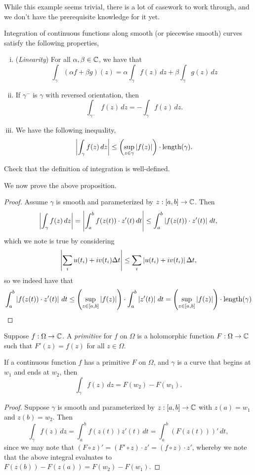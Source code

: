\noindent While this example seems trivial, there is a lot of casework to work through, and we don't have the prerequisite knowledge for it yet.
\begin{proposition}
    Integration of continuous functions along smooth (or piecewise smooth) curves satisfy the following properties,
    \begin{enumerate}[(i)]
        \item (\textit{Linearity}) For all $\alpha, \beta \in \mathbb C$, we have that
        \[ \int_\gamma  (\alpha f + \beta g)(z) = \alpha \int_\gamma f(z) \, dz + \beta \int_\gamma g(z) \, dz\]
        \item If $\gamma^-$ is $\gamma$ with reversed orientation, then
        \[ \int_{\gamma^-} f(z) \, dz = -\int_\gamma f(z) \, dz. \]
        \item We have the following inequality,
        \[ \left\lvert \int_\gamma f(z) \, dz \right\rvert \leq \left(\sup_{z \in \gamma} \left\lvert f(z) \right\rvert\right) \cdot \operatorname{length}(\gamma). \]
    \end{enumerate}
\end{proposition}
\begin{exercise}
    Check that the definition of integration is well-defined.
\end{exercise}
\noindent We now prove the above proposition.
\begin{proof}
    Assume $\gamma$ is smooth and parameterized by $z : [a, b] \to \mathbb C$. Then
    \[ \left\lvert \int_\gamma f(z) \, dz \right\rvert = \left\lvert \int_a^b f(z(t)) \cdot z'(t) \, dt \right\rvert \leq \int_a^b \left\lvert f(z(t)) \cdot z'(t) \right\rvert \, dt, \]
    which we note is true by considering
    \[ \left\lvert \sum_i u(t_i) + i v(t_i) \Delta t \right\rvert \leq \sum_i \left\lvert u(t_i) + iv(t_i) \right\rvert \Delta t, \]
    so we indeed have that
    \[ \int_a^b \left\lvert f(z(t)) \cdot z'(t) \right\rvert \, dt \leq \left(\sup_{z \in [a, b]} \left\lvert f(z) \right\rvert\right) \cdot \int_a^b \left\lvert z'(t) \right\rvert \, dt = \left(\sup_{z \in [a, b]} \left\lvert f(z) \right\rvert\right) \cdot \operatorname{length}(\gamma) \qedhere \]
\end{proof}
\noindent Suppose $f : \Omega \to \mathbb C$. A \textit{primitive} for $f$ on $\Omega$ is a holomorphic function $F : \Omega \to \mathbb C$ such that $F'(z) = f(z)$ for all $z \in \Omega$. 
\begin{theorem}
    If a continuous function $f$ has a primitive $F$ on $\Omega$, and $\gamma$ is a curve that begins at $w_1$ and ends at $w_2$, then
    \[ \int_\gamma f(z) \, dz = F(w_2) - F(w_1). \]
\end{theorem}
\begin{proof}
    Suppose $\gamma$ is smooth and parameterized by $z : [a, b] \to \mathbb C$ with $z(a) = w_1$ and $z(b) = w_2$. Then
    \[ \int_\gamma f(z) \, dz = \int_a^b f(z(t)) z'(t) \, dt = \int_a^b (F(z(t)))' \, dt, \]
    since we may note that $(F \circ z)' = (F' \circ z) \cdot z' = (f \circ z) \cdot z'$, whereby we note that the above integral evaluates to $F(z(b)) - F(z(a)) = F(w_2) - F(w_1)$.
\end{proof}
